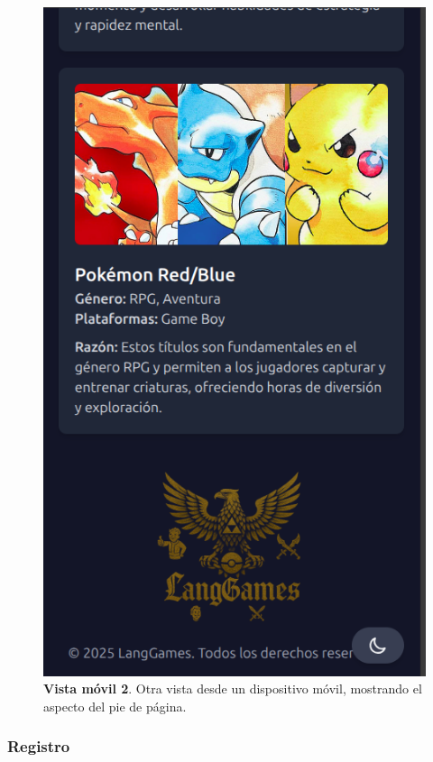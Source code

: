 \begin{figure}[H]
	\centering
	\includegraphics[width=1\linewidth]{imagenes/homeMovil2.png}
	\caption[\textbf{Vista móvil 2}.]{\textbf{Vista móvil 2}. Otra vista desde un dispositivo móvil, mostrando el aspecto del pie de página.}
	\label{imagen-movil-2}
\end{figure}



\subsubsection{Registro}

